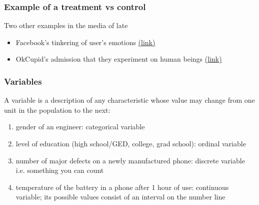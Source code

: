\documentclass[handout]{beamer}
\newcommand{\blue}[1]{\textcolor{blue2}{#1}}
\begin{document}
\begin{frame}
\frametitle{Example of a treatment vs control}
Two other examples in the media of late
\begin{itemize}
\item Facebook's tinkering of user's emotions \blue{\href{http://www.nytimes.com/2014/06/30/technology/facebook-tinkers-with-users-emotions-in-news-feed-experiment-stirring-outcry.html}{(link)}}
\item OkCupid's admission that they experiment on human beings \blue{\href{http://blog.okcupid.com/index.php/we-experiment-on-human-beings/}{(link)}}
\end{itemize}

\end{frame}



\begin{frame}
\frametitle{Variables}
A \blue{variable} is a description of any characteristic whose value may change from one unit in the population to the next:
\begin{enumerate}
\pause\item gender of an engineer:  \blue{categorical} variable
\pause\item level of education (high school/GED, college, grad school): \blue{ordinal} variable
\pause\item number of major defects on a newly manufactured phone: \blue{discrete} variable i.e. something you can count
\pause\item temperature of the battery in a phone after 1 hour of use: \blue{continuous} variable; its possible values consist of an interval on the number line
\end{enumerate}

\end{frame}
\end{document}
